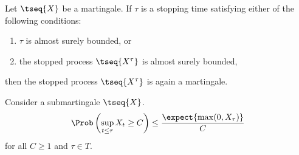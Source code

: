     \begin{theorem}
        Let $\tseq{X}$ be a martingale. If $\tau$ is a stopping time satisfying either of the following conditions:
        \begin{enumerate}
            \item $\tau$ is almost surely bounded, or
            \item the stopped process $\tseq{X^\tau}$ is almost surely bounded,
        \end{enumerate}
        then the stopped process $\tseq{X^\tau}$ is again a martingale.
    \end{theorem}

    \begin{property}\label{prob:doob_inequality}
        Consider a \cdlg submartingale $\tseq{X}$.
        \begin{gather}
            \Prob\left(\sup_{t\leq\tau}X_t\geq C\right)\leq\frac{\expect{\max(0,X_\tau)}}{C}
        \end{gather}
        for all $C\geq1$ and $\tau\in T$.
    \end{property}

